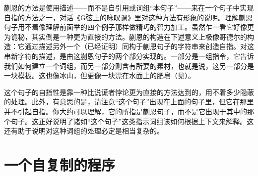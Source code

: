 蒯恩的方法是使用描述——而不是自引用或词组“本句子”——来在一个句子中实现自指的方法之一，对话《G弦上的咏叹调》里对这种方法有形象的说明。理解蒯恩句子用不着像理解前面举的四个例子那样做精巧的智力加工。虽然乍一看它好像更为诡秘，其实倒是一种更为直接的方法。蒯恩的构造在下述意义上极像哥德尔的构造：它通过描述另外一个（已经证明）同构于蒯恩句子的字符串来创造自指。对这串新字符的描述，是由这蒯恩句子的两个部分实现的。一部分是一组指令，它告诉我们如何建立一个词组，而另一部分则含有所要的素材，也就是说，这另一部分是一块模板。这也像冰山，但更像一块漂在水面上的肥皂（见）。

\begin{figure}
\caption[蒯恩句子的肥皂。]
  {}
\end{figure}

这个句子的自指性是靠一种比说谎者悖论更为直接的方法达到的，用不着多少隐蔽的处理。此外，有意思的是，请注意“这个句子”出现在上面的句子里，但它在那里并不引起自指。你大约可以理解，它的所指是蒯恩句子，而不是它出现于其中的那个句子。这正好说明了诸如“这个句子”这类指示词组该如何根据上下文来解释。这还有助于说明对这种词组的处理必定是相当复杂的。

\section{一个自复制的程序}

